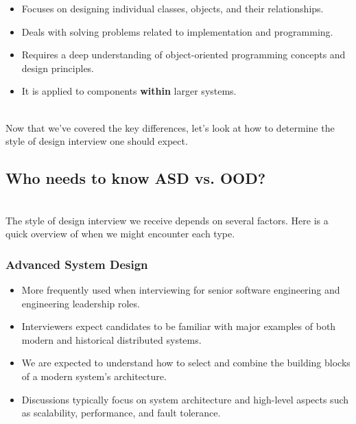 \begin{itemize}
\item
\protect{}\label{6zyRTiTN6YszNwEnrgX1g}
Focuses on designing individual classes, objects, and their relationships.
\item
\protect{}\label{qXiNNY-RAZATVke738Hfs}
Deals with solving problems related to implementation and programming.
\item
\protect{}\label{QeHZfTLpsw3glGhrNJhNT}
Requires a deep understanding of object-oriented programming concepts and design principles.
\item
\protect{}\label{FrXEHMtI9LA148PJTxVyJ}
It is applied to components \textbf{within} larger systems.
\end{itemize}
\\
Now that we've covered the key differences, let's look at how to determine the style of design interview one should expect.

\subsection{Who needs to know ASD vs. OOD?}\label{8goB9iM5B-HrYreWYu_02}
\\
The style of design interview we receive depends on several factors. Here is a quick overview of when we might encounter each type.

\subsubsection{Advanced System Design}\label{BAhIehSZDcMxGbUWRYO4t}

\begin{itemize}
\item
\protect{}\label{ICuaFqdQfjJwshsQiLTS3}
More frequently used when interviewing for senior software engineering and engineering leadership roles.
\item
\protect{}\label{4yuGccPVIwZcIh2MId1gK}
Interviewers expect candidates to be familiar with major examples of both modern and historical distributed systems.
\item
\protect{}\label{AjYMLLmq3G6jWnmNTPXct}
We are expected to understand how to select and combine the building blocks of a modern system's architecture.
\item
\protect{}\label{oenMzY-HHAPnWHNDDgDVJ}
Discussions typically focus on system architecture and high-level aspects such as scalability, performance, and fault tolerance.
\end{itemize}

